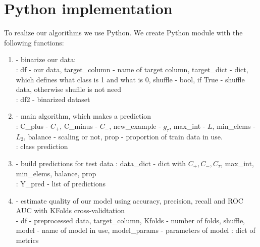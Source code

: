 \documentclass[12t]{article}
\begin{document}
\section{Python implementation}
To realize our algorithms we use Python. We create Python module  with the following functions:
\begin{enumerate}
	\item {} - binarize our data: \\
	: df - our data, target\_column - name of target column, target\_dict - dict, which defines what class is 1 and what is 0, shuffle - bool, if True - shuffle data, otherwise shuflle is not need \\
	: df2 - binarized dataset 
	
	\item {} - main algorithm, which makes a prediction \\
	: C\_plus - $C_{+}$, C\_minus - $C_{-}$, new\_example - $g_{\tau}$, max\_int - $L$, min\_elems - $L_2$, balance - scaling or not, prop - proportion of train data in use.  \\
	: class prediction
	
	\item {} - build predictions for test data
	: data\_dict - dict with $C_{+}, C_{-}, C_{\tau}$, max\_int, min\_elems, balance, prop\\
	: Y\_pred - list of predictions
	
	\item {} - estimate quality of our model using accuracy, precision, recall and ROC AUC with KFolds cross-validtation \\
	 - df - preprocessed data, target\_column, Kfolds - number of folds, shuffle, model - name of model in use, model\_params - parameters of model 
	: dict of metrics 
	
\end{enumerate}
\end{document}
